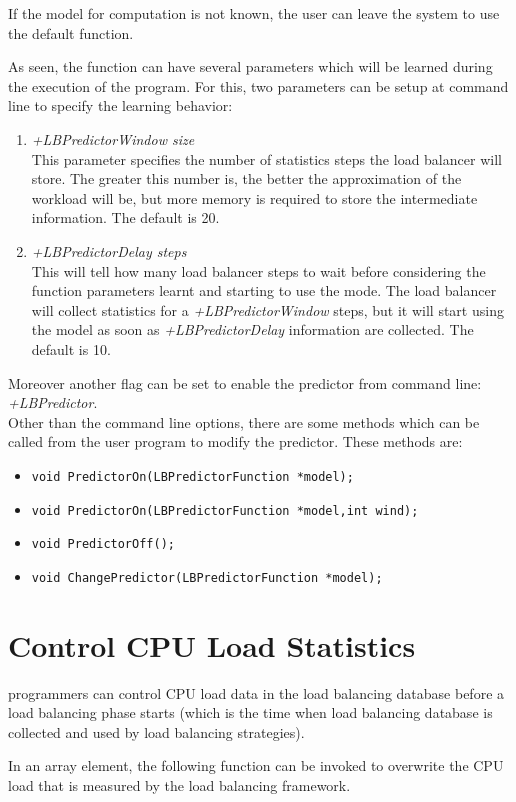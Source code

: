 If the model for computation is not known, the user can leave the system to
use the default function.

As seen, the function can have several parameters which will be learned during
the execution of the program. For this, two parameters can be setup at command
line to specify the learning behavior:
\begin{enumerate}
\item {\em +LBPredictorWindow size}\\
This parameter specifies the number of statistics steps the load balancer will
store.  The greater this number is, the better the
approximation of the workload will be, but more memory is required to store
the intermediate information. The default is 20.
\item {\em +LBPredictorDelay steps}\\
This will tell how many load balancer steps to wait before considering the
function parameters learnt and starting to use the mode. The load balancer will
collect statistics for a {\em +LBPredictorWindow} steps, but it will start using
the model as soon as {\em +LBPredictorDelay} information are collected. The
default is 10.
\end{enumerate}
Moreover another flag can be set to enable the predictor from command line: {\em
+LBPredictor}.\\
Other than the command line options, there are some methods
which can be called from the user program to modify the predictor. These methods are:
\begin{itemize}
\item {\tt void PredictorOn(LBPredictorFunction *model);}
\item {\tt void PredictorOn(LBPredictorFunction *model,int wind);}
\item {\tt void PredictorOff();}
\item {\tt void ChangePredictor(LBPredictorFunction *model);}
\end{itemize}

\section{Control CPU Load Statistics}

\charmpp{} programmers can control CPU load data in the load balancing database
before a load balancing phase starts (which is the time when load balancing
database is collected and used by load balancing strategies).

In an array element, the following function can be invoked to overwrite the 
CPU load that is measured by the load balancing framework.

